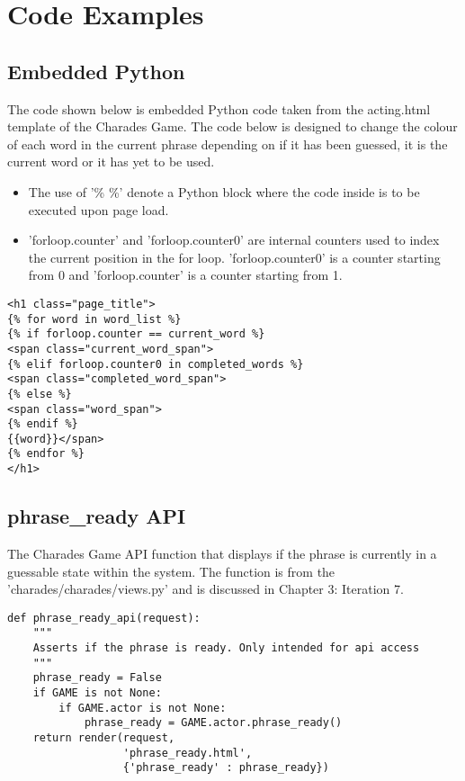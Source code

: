\chapter{Code Examples}

\section{Embedded Python}

The code shown below is embedded Python code taken from the acting.html template of the Charades Game. The code below is designed to change the colour of each word in the current phrase depending on if it has been guessed, it is the current word or it has yet to be used.

\begin{itemize}
	\item The use of '{\% \%}' denote a Python block where the code inside is to be executed upon page load. 
	
	\item 'forloop.counter' and 'forloop.counter0' are internal counters used to index the current position in the for loop. 'forloop.counter0' is a counter starting from 0 and 'forloop.counter' is a counter starting from 1.

\end{itemize}

\begin{verbatim}
<h1 class="page_title">
{% for word in word_list %}
{% if forloop.counter == current_word %}
<span class="current_word_span">
{% elif forloop.counter0 in completed_words %}
<span class="completed_word_span">
{% else %}
<span class="word_span">
{% endif %}
{{word}}</span>
{% endfor %}
</h1>
\end{verbatim}

\newpage

\section{phrase\_ready API}

The Charades Game API function that displays if the phrase is currently in a guessable state within the system. The function is from the 'charades/charades/views.py' and is discussed in Chapter 3: Iteration 7.

\begin{verbatim}
def phrase_ready_api(request):
    """
    Asserts if the phrase is ready. Only intended for api access
    """
    phrase_ready = False
    if GAME is not None:
        if GAME.actor is not None:
            phrase_ready = GAME.actor.phrase_ready()
    return render(request,
    		      'phrase_ready.html',
    		      {'phrase_ready' : phrase_ready})
\end{verbatim}


